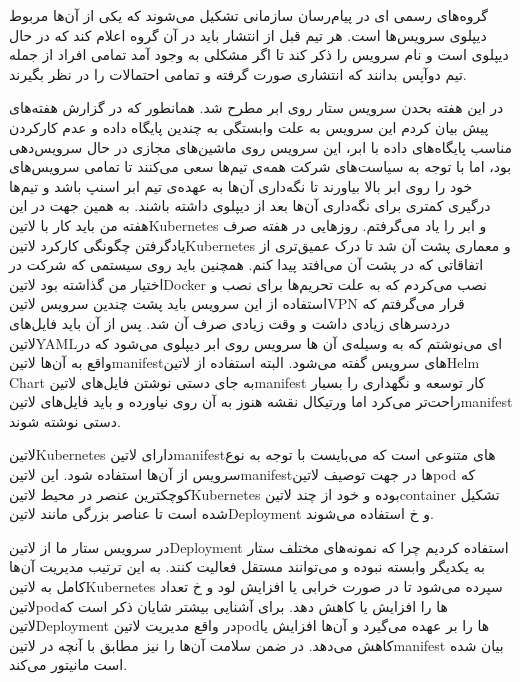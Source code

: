 \documentclass[a4]{report}
\begin{document}
گروه‌های رسمی ای در پیام‌رسان سازمانی تشکیل می‌شوند که یکی از آن‌ها مربوط دیپلوی سرویس‌ها است. هر تیم قبل از انتشار باید در آن گروه اعلام کند که در حال دیپلوی است و نام سرویس را ذکر کند
تا اگر مشکلی به وجود آمد تمامی افراد از جمله تیم دوآپس بدانند که انتشاری صورت گرفته و تمامی احتمالات را در نظر بگیرند.


در این هفته بحدن سرویس ستار روی ابر مطرح شد. همانطور که در گزارش هفته‌های پیش بیان کردم این سرویس به علت وابستگی به چندین پایگاه داده و
عدم کارکردن مناسب پایگاه‌های داده با ابر، این سرویس روی ماشین‌های مجازی در حال سرویس‌دهی بود، اما با توجه به سیاست‌های شرکت همه‌ی تیم‌ها سعی می‌کنند
تا تمامی سرویس‌های خود را روی ابر بالا بیاورند تا نگه‌داری آن‌ها به عهده‌ی تیم ابر اسنپ باشد و تیم‌ها درگیری کمتری برای نگه‌داری آن‌ها بعد از دیپلوی داشته باشند.
به همین جهت در این هفته من باید کار با ‌لاتین{Kubernetes} و ابر را یاد می‌گرفتم.
روزهایی در هفته صرف یادگرفتن چگونگی کارکرد ‌لاتین{Kubernetes} و معماری پشت آن شد تا درک عمیق‌تری از اتفاقاتی که در پشت آن می‌افتد پیدا کنم.
همچنین باید روی سیستمی که شرکت در اختیار من گذاشته بود ‌لاتین{Docker} نصب می‌کردم که به علت تحریم‌ها برای نصب و استفاده از این سرویس باید پشت
چندین سرویس ‌لاتین{VPN} قرار می‌گرفتم که دردسرهای زیادی داشت و وقت زیادی صرف آن شد.
پس از آن باید فایل‌های ‌لاتین{YAML}ای می‌نوشتم که به وسیله‌ی آن ها سرویس روی ابر دیپلوی می‌شود که در واقع به آن‌ها ‌لاتین{manifest}های سرویس گفته می‌شود.
البته استفاده از ‌لاتین{Helm Chart} به جای دستی نوشتن فایل‌های ‌لاتین{manifest} کار توسعه و نگهداری را بسیار راحت‌تر می‌کرد اما ورتیکال نقشه هنوز به آن روی نیاورده و باید فایل‌های
‌لاتین{manifest} دستی نوشته شوند.

‌لاتین{Kubernetes} دارای ‌لاتین{manifest}های متنوعی است که می‌بایست با توجه به نوع سرویس از آن‌ها استفاده شود.
این ‌لاتین{manifest}ها در جهت توصیف ‌لاتین{pod} که کوچکترین عنصر در محیط ‌لاتین{Kubernetes} بوده و خود از چند ‌لاتین{container}
تشکیل شده است تا عناصر بزرگی مانند ‌لاتین{Deployment} و ‌خ استفاده می‌شوند.

در سرویس ستار ما از ‌لاتین{Deployment} استفاده کردیم چرا که نمونه‌های مختلف ستار به یکدیگر وابسته نبوده و می‌توانند مستقل فعالیت کنند.
به این ترتیب مدیریت آن‌ها کامل به ‌لاتین{Kubernetes} سپرده می‌شود تا در صورت خرابی یا افزایش لود و ‌خ تعداد ‌لاتین{pod}ها را افزایش یا کاهش دهد.
برای آشنایی بیشتر شایان ذکر است که ‌لاتین{Deployment} در واقع مدیریت ‌لاتین{pod}ها را بر عهده می‌گیرد و آن‌ها افزایش یا کاهش می‌دهد.
در ضمن سلامت آن‌ها را نیز مطابق با آنچه در ‌لاتین{manifest} بیان شده است مانیتور می‌کند.
\end{document}
